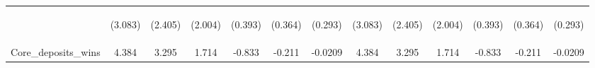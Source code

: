 \documentclass[]{article}
\begin{document}
\begin{center}
\begin{tabular}{lcccccccccccc}
\vspace{4pt} & \begin{footnotesize}(3.083)\end{footnotesize} & \begin{footnotesize}(2.405)\end{footnotesize} & \begin{footnotesize}(2.004)\end{footnotesize} & \begin{footnotesize}(0.393)\end{footnotesize} & \begin{footnotesize}(0.364)\end{footnotesize} & \begin{footnotesize}(0.293)\end{footnotesize} & \begin{footnotesize}(3.083)\end{footnotesize} & \begin{footnotesize}(2.405)\end{footnotesize} & \begin{footnotesize}(2.004)\end{footnotesize} & \begin{footnotesize}(0.393)\end{footnotesize} & \begin{footnotesize}(0.364)\end{footnotesize} & \begin{footnotesize}(0.293)\end{footnotesize} \\
Core\_deposits\_wins & 4.384 & 3.295 & 1.714 & -0.833 & -0.211 & -0.0209 & 4.384 & 3.295 & 1.714 & -0.833 & -0.211 & -0.0209 \\

\end{tabular}
\end{center}
\end{document}
